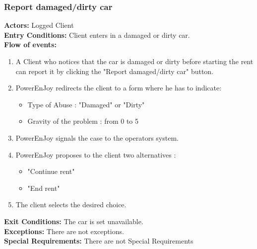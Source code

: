 \subsubsection{Report damaged/dirty car}
%
\textbf{Actors:}
Logged Client \\
%
\textbf{Entry Conditions:}
Client enters in a damaged or dirty car.\\
%
\textbf{Flow of events:}
\begin{enumerate}
\item A Client who notices that the car is damaged or dirty before starting the rent can report it by clicking the "Report damaged/dirty car" button.
\item PowerEnJoy redirects the client to a form where he has to indicate:
\begin{itemize}
\item Type of Abuse : "Damaged" or "Dirty" 
\item Gravity of the problem : from 0 to 5
\end{itemize}
\item PowerEnJoy signals the case to the operators system.
\item PowerEnJoy proposes to the client two alternatives :
\begin{itemize}
\item "Continue rent"
\item "End rent"
\end{itemize}
\item The client selects the desired choice.
\end{enumerate}
%
\textbf{Exit Conditions:}
The car is set unavailable.  \\
\textbf{Exceptions:}
 There are not exceptions. \\
\textbf{Special Requirements:}
 There are not Special Requirements\\

